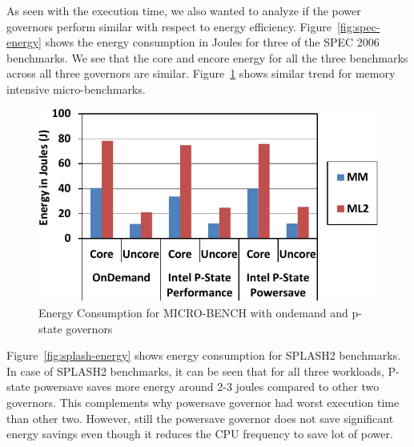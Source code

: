 As seen with the execution time, we also wanted to analyze
if the power governors perform similar with respect to energy efficiency.
Figure~\ref{fig:spec-energy} shows the energy consumption in Joules for three of the SPEC 2006
benchmarks. We see that the core and encore energy for all the three 
benchmarks across all three governors are similar.  
Figure~\ref{fig:micro-energy} shows similar trend for memory intensive micro-benchmarks.


\begin{figure}[h]
  \begin{center}
\includegraphics[width=\linewidth]{figs/def-drivers-micro-crop.pdf}
  \end{center}
  \vspace{-0.1in}
  \caption{Energy Consumption for MICRO-BENCH with ondemand and p-state governors}
	\label{fig:micro-energy}
\end{figure}

Figure~\ref{fig:splash-energy} shows energy consumption for SPLASH2 benchmarks.
In case of SPLASH2 benchmarks, it can be seen that for all three workloads, P-state powersave saves more
energy around 2-3 joules compared to other two governors. This complements
why powersave governor had worst execution time than other two. However, still 
the powersave governor does not save significant energy savings even though it reduces 
the CPU frequency to save lot of power.

